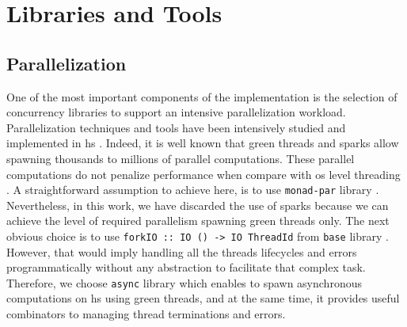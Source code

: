 \section{Libraries and Tools}
\subsection{Parallelization} 
One of the most important components of the implementation is the selection of concurrency libraries to support an intensive parallelization workload. Parallelization techniques and tools have been intensively studied and implemented in \acrshort{hs} \cite{monadpar}. 
Indeed, it is well known that green threads and sparks allow spawning thousands to millions of parallel computations. 
These parallel computations do not penalize performance when compare with \acrfull{os} level threading \cite{parallelbook}. 
A straightforward assumption to achieve here, is to use \texttt{monad-par} library \cite{monadparlib, monadpar}. 
Nevertheless, in this work, we have discarded the use of sparks \cite{sparks} because we can achieve the level of required parallelism spawning green threads only.
The next obvious choice is to use \texttt{forkIO :: IO () -> IO ThreadId} from \texttt{base} library \cite{forkio}. 
However, that would imply handling all the threads lifecycles and errors programmatically without any abstraction to facilitate that complex task. 
Therefore, we choose \texttt{async} library \cite{async} which enables to spawn asynchronous computations \cite{parallelbook} on \acrshort{hs} using green threads, and at the same time, it provides useful combinators to managing thread terminations and errors.

